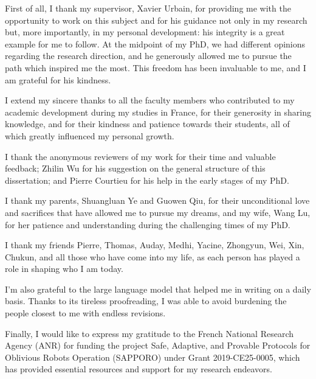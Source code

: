 

First of all, I thank my supervisor, Xavier Urbain, for providing me with the opportunity to work on this subject and for his guidance not only in my research but, more importantly, in my personal development: his integrity is a great example for me to follow. At the midpoint of my PhD, we had different opinions regarding the research direction, and he generously allowed me to pursue the path which inspired me the most. This freedom has been invaluable to me, and I am grateful for his kindness.

I extend my sincere thanks to all the faculty members who contributed to my academic development during my studies in France, for their generosity in sharing knowledge, and for their kindness and patience towards their students, all of which greatly influenced my personal growth.

I thank the anonymous reviewers of my work for their time and valuable feedback; Zhilin Wu for his suggestion on the general structure of this dissertation; and Pierre Courtieu for his help in the early stages of my PhD.

I thank my parents, Shuangluan Ye and Guowen Qiu, for their unconditional love and sacrifices that have allowed me to pursue my dreams, and my wife, Wang Lu, for her patience and understanding during the challenging times of my PhD.

I thank my friends Pierre, Thomas, Auday, Medhi, Yacine, Zhongyun, Wei, Xin, Chukun, and all those who have come into my life, as each person has played a role in shaping who I am today.

I'm also grateful to the large language model that helped me in writing on a daily basis. Thanks to its tireless proofreading, I was able to avoid burdening the people closest to me with endless revisions.


Finally, I would like to express my gratitude to the French National Research Agency (ANR) for funding the project Safe, Adaptive, and Provable Protocols for Oblivious Robots Operation (SAPPORO) under Grant 2019-CE25-0005, which has provided essential resources and support for my research endeavors.  
